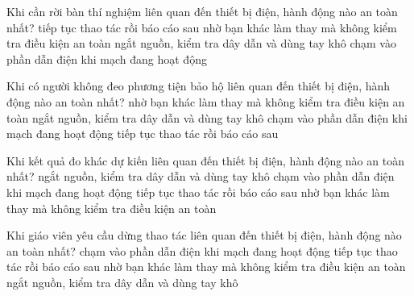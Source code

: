 \begin{ex}
Khi cần rời bàn thí nghiệm liên quan đến thiết bị điện, hành động nào an toàn nhất?
\choice
{tiếp tục thao tác rồi báo cáo sau}
{nhờ bạn khác làm thay mà không kiểm tra điều kiện an toàn}
{\True ngắt nguồn, kiểm tra dây dẫn và dùng tay khô}
{chạm vào phần dẫn điện khi mạch đang hoạt động}
\end{ex}

\begin{ex}
Khi có người không đeo phương tiện bảo hộ liên quan đến thiết bị điện, hành động nào an toàn nhất?
\choice
{nhờ bạn khác làm thay mà không kiểm tra điều kiện an toàn}
{\True ngắt nguồn, kiểm tra dây dẫn và dùng tay khô}
{chạm vào phần dẫn điện khi mạch đang hoạt động}
{tiếp tục thao tác rồi báo cáo sau}
\end{ex}

\begin{ex}
Khi kết quả đo khác dự kiến liên quan đến thiết bị điện, hành động nào an toàn nhất?
\choice
{\True ngắt nguồn, kiểm tra dây dẫn và dùng tay khô}
{chạm vào phần dẫn điện khi mạch đang hoạt động}
{tiếp tục thao tác rồi báo cáo sau}
{nhờ bạn khác làm thay mà không kiểm tra điều kiện an toàn}
\end{ex}

\begin{ex}
Khi giáo viên yêu cầu dừng thao tác liên quan đến thiết bị điện, hành động nào an toàn nhất?
\choice
{chạm vào phần dẫn điện khi mạch đang hoạt động}
{tiếp tục thao tác rồi báo cáo sau}
{nhờ bạn khác làm thay mà không kiểm tra điều kiện an toàn}
{\True ngắt nguồn, kiểm tra dây dẫn và dùng tay khô}
\end{ex}

